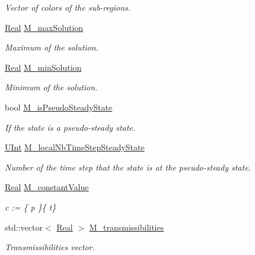 \begin{DoxyCompactItemize}
\begin{DoxyCompactList}\small\item\em Vector of colors of the sub-\/regions. \end{DoxyCompactList}\item 
\hyperlink{namespaceFVCode3D_a40c1f5588a248569d80aa5f867080e83}{Real} \hyperlink{classFVCode3D_1_1MSR_a292e038fb48f7f4f39238d375ea6f6e0}{M\+\_\+max\+Solution}
\begin{DoxyCompactList}\small\item\em Maximum of the solution. \end{DoxyCompactList}\item 
\hyperlink{namespaceFVCode3D_a40c1f5588a248569d80aa5f867080e83}{Real} \hyperlink{classFVCode3D_1_1MSR_a6e8eb6a0513e4b46241950b8ee2b7212}{M\+\_\+min\+Solution}
\begin{DoxyCompactList}\small\item\em Minimum of the solution. \end{DoxyCompactList}\item 
bool \hyperlink{classFVCode3D_1_1MSR_aa4276f60467226b5aae9e12c024701f6}{M\+\_\+is\+Pseudo\+Steady\+State}
\begin{DoxyCompactList}\small\item\em If the state is a pseudo-\/steady state. \end{DoxyCompactList}\item 
\hyperlink{namespaceFVCode3D_a4bf7e328c75d0fd504050d040ebe9eda}{U\+Int} \hyperlink{classFVCode3D_1_1MSR_a481d90b7ea3b6d1f3f818f811e58a9a3}{M\+\_\+local\+Nb\+Time\+Step\+Steady\+State}
\begin{DoxyCompactList}\small\item\em Number of the time step that the state is at the pseudo-\/steady state. \end{DoxyCompactList}\item 
\hyperlink{namespaceFVCode3D_a40c1f5588a248569d80aa5f867080e83}{Real} \hyperlink{classFVCode3D_1_1MSR_ae1152dcd118f020c5cd9fefe4eafd5e4}{M\+\_\+constant\+Value}
\begin{DoxyCompactList}\small\item\em c \+:= \{  p \}\{  t\} \end{DoxyCompactList}\item 
std\+::vector$<$ \hyperlink{namespaceFVCode3D_a40c1f5588a248569d80aa5f867080e83}{Real} $>$ \hyperlink{classFVCode3D_1_1MSR_abcb3d099c26d9747b02231cb0d3b7bb3}{M\+\_\+transmissibilities}
\begin{DoxyCompactList}\small\item\em Transmissibilities vector. \end{DoxyCompactList}\end{DoxyCompactItemize}



